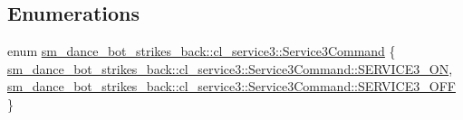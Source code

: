 \subsection*{Enumerations}
\begin{DoxyCompactItemize}
\item 
enum \hyperlink{namespacesm__dance__bot__strikes__back_1_1cl__service3_ac2ccf5d911840620cf8d0443c29d8b6b}{sm\+\_\+dance\+\_\+bot\+\_\+strikes\+\_\+back\+::cl\+\_\+service3\+::\+Service3\+Command} \{ \hyperlink{namespacesm__dance__bot__strikes__back_1_1cl__service3_ac2ccf5d911840620cf8d0443c29d8b6ba13cdca48a01bbb44fa8fb35567fbc58e}{sm\+\_\+dance\+\_\+bot\+\_\+strikes\+\_\+back\+::cl\+\_\+service3\+::\+Service3\+Command\+::\+S\+E\+R\+V\+I\+C\+E3\+\_\+\+ON}, 
\hyperlink{namespacesm__dance__bot__strikes__back_1_1cl__service3_ac2ccf5d911840620cf8d0443c29d8b6ba642ed22a7f6b816840289b4256116e9e}{sm\+\_\+dance\+\_\+bot\+\_\+strikes\+\_\+back\+::cl\+\_\+service3\+::\+Service3\+Command\+::\+S\+E\+R\+V\+I\+C\+E3\+\_\+\+O\+FF}
 \}
\end{DoxyCompactItemize}
